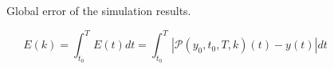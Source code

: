\begin{frame}
    \begin{figure}[ht]
        \centering
        \scalebox{0.8}{}
        \caption{Global error of the simulation results.}
        \label{fig:iters_log}
    \end{figure}
    \begin{equation*}
        E(k) = \int_{t_0}^{T}E(t) dt = \int_{t_0}^{T}\left|\mathcal{P}(y_0,t_0,T,k)(t)-y(t)\right| dt
    \end{equation*}
\end{frame}